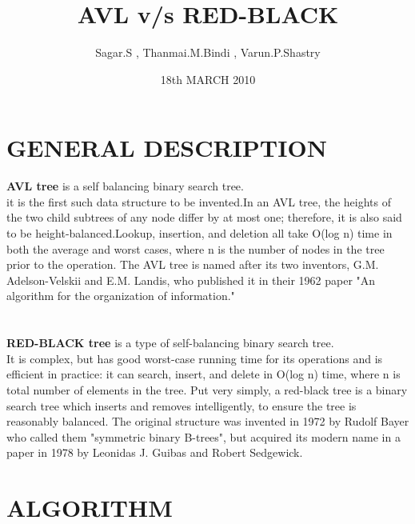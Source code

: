 \documentclass{article}
\begin{document}
\title{AVL v/s RED-BLACK}
\author{Sagar.S , Thanmai.M.Bindi , Varun.P.Shastry }
\date{18th MARCH 2010}
\maketitle



\section{GENERAL DESCRIPTION}
\textbf{AVL tree} is a self balancing binary search tree.\\
it is the first such data structure to be invented.In an AVL tree, the heights of the two child subtrees of any node differ by at most one; therefore, it is also said to be height-balanced.Lookup, insertion, and deletion all take O(log n) time in both the average and worst cases, where n is the number of nodes in the tree prior to the operation.
The AVL tree is named after its two inventors, G.M. Adelson-Velskii and E.M. Landis, who published it in their 1962 paper "An algorithm for the organization of information."
\\
\\
\\
\textbf{RED-BLACK tree} is a type of self-balancing binary search tree.\\
It is complex, but has good worst-case running time for its operations and is efficient in practice: it can search, insert, and delete in O(log n) time, where n is total number of elements in the tree. Put very simply, a red-black tree is a binary search tree which inserts and removes intelligently, to ensure the tree is reasonably balanced.
The original structure was invented in 1972 by Rudolf Bayer who called them "symmetric binary B-trees", but acquired its modern name in a paper in 1978 by Leonidas J. Guibas and Robert Sedgewick.
\newpage
\section{ALGORITHM}
\end{document}
